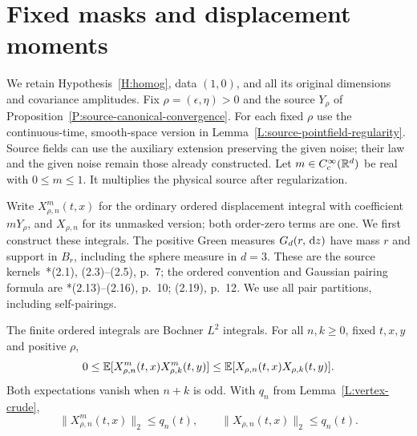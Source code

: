 \section{Fixed masks and displacement moments}
\label{S:masked-moments}

We retain Hypothesis~\ref{H:homog}, data $(1,0)$, and all its original
dimensions and covariance amplitudes. Fix $\rho = (\epsilon,\eta) > 0$ and the
source $Y_\rho$ of Proposition~\ref{P:source-canonical-convergence}. For each
fixed $\rho$ use the continuous-time, smooth-space version in
Lemma~\ref{L:source-pointfield-regularity}. Source fields can use the auxiliary
extension preserving the given noise; their law and the given noise remain those
already constructed. Let $m \in C_c^\infty(\mathbb{R}^d)$ be real with $0 \le m \le 1$.
It multiplies the physical source after regularization.

Write $X_{\rho,n}^m(t,x)$ for the ordinary ordered displacement integral with
coefficient $mY_\rho$, and $X_{\rho,n}$ for its unmasked version; both
order-zero terms are one. We first construct these integrals. The positive Green
measures $G_d(r,\,\mathrm{d} z)$ have mass $r$ and support in $B_r$, including the sphere
measure in $d = 3$. These are the source
kernels~\cite{chen:author2026:time-dependency}*{(2.1), (2.3)--(2.5), p.~7}; the
ordered convention and Gaussian pairing formula are
\cite{chen:author2026:time-dependency}*{(2.13)--(2.16), p.~10; (2.19), p.~12}.
We use all pair partitions, including self-pairings.

\begin{lemma}
  \label{L:masked-chain-comparison}
  The finite ordered integrals are Bochner $L^2$ integrals. For all $n,k \ge 0$,
  fixed $t,x,y$ and positive $\rho$,
  \begin{equation}\label{E:masked-order-comparison}
    0\le \mathbb{E}[X_{\rho,n}^m(t,x)X_{\rho,k}^m(t,y)]
    \le \mathbb{E}[X_{\rho,n}(t,x)X_{\rho,k}(t,y)].
  \end{equation}
  Both expectations vanish when $n+k$ is odd. With $q_n$ from
  Lemma~\ref{L:vertex-crude},
  \begin{equation}\label{E:masked-order-bound}
    \|X_{\rho,n}^m(t,x)\|_2\le q_n(t),\qquad
    \|X_{\rho,n}(t,x)\|_2\le q_n(t).
  \end{equation}
\end{lemma}

